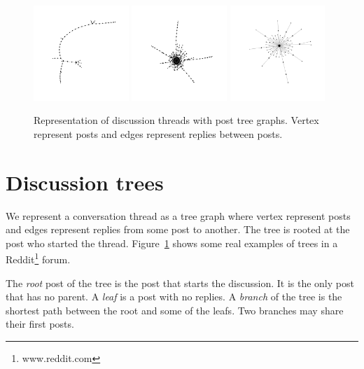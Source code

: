 \documentclass[9pt,technote]{IEEEtran}
\begin{document}
\begin{figure}
	\centering
	\includegraphics[width=0.32\textwidth]{tree1}
	\includegraphics[width=0.32\textwidth]{tree2}
	\includegraphics[width=0.32\textwidth]{tree3}
	\caption{Representation of discussion threads with post tree graphs. Vertex represent posts and edges represent replies between posts.}
	\label{fig:trees}
\end{figure}

\section{Discussion trees}
We represent a conversation thread as a tree graph where vertex represent posts and edges represent replies from some post to another. The tree is rooted at the post who started the thread. Figure~\ref{fig:trees} shows some real examples of trees in a Reddit\footnote{www.reddit.com} forum. 

The \textit{root} post of the tree is the post that starts the discussion. It is the only post that has no parent. A \textit{leaf} is a post with no replies.
A \textit{branch} of the tree is the shortest path between the root and some of the leafs. Two branches may share their first posts.
\end{document}
